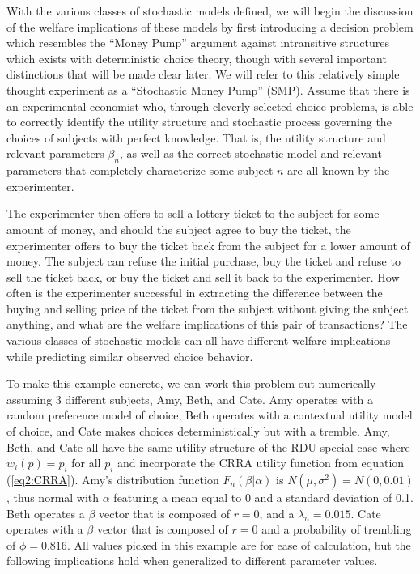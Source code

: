 \documentclass[11pt,a4paper]{report}
\begin{document}
With the various classes of stochastic models defined, we will begin the discussion of the welfare implications of these models by first introducing a decision problem which resembles the \enquote{Money Pump} argument against intransitive structures which exists with deterministic choice theory, though with several important distinctions that will be made clear later.
We will refer to this relatively simple thought experiment as a \enquote{Stochastic Money Pump} (SMP).
Assume that there is an experimental economist who, through cleverly selected choice problems, is able to correctly identify the utility structure and stochastic process governing the choices of subjects with perfect knowledge.
That is, the utility structure and relevant parameters $\beta_n$, as well as the correct stochastic model and relevant parameters that completely characterize some subject $n$ are all known by the experimenter.

The experimenter then offers to sell a lottery ticket to the subject for some amount of money, and should the subject agree to buy the ticket, the experimenter offers to buy the ticket back from the subject for a lower amount of money.
The subject can refuse the initial purchase, buy the ticket and refuse to sell the ticket back, or buy the ticket and sell it back to the experimenter.
How often is the experimenter successful in extracting the difference between the buying and selling price of the ticket from the subject without giving the subject anything, and what are the welfare implications of this pair of transactions?
The various classes of stochastic models can all have different welfare implications while predicting similar observed choice behavior.

To make this example concrete, we can work this problem out numerically assuming 3 different subjects, Amy, Beth, and Cate.
Amy operates with a random preference model of choice, Beth operates with a contextual utility model of choice, and Cate makes choices deterministically but with a tremble.
Amy, Beth, and Cate all have the same utility structure of the RDU special case where $w_i(p)=p_i$ for all $p_i$ and incorporate the CRRA utility function from equation (\ref{eq2:CRRA}).
Amy's distribution function $F_n(\beta|\alpha)$ is $N(\mu,\sigma^2) = N(0,0.01)$, thus normal with $\alpha$ featuring a mean equal to 0 and a standard deviation of 0.1.
Beth operates a $\beta$ vector that is composed of $r=0$, and a $\lambda_n = 0.015$.
Cate operates with a $\beta$ vector that is composed of $r=0$ and a probability of trembling of $\phi = 0.816$.
All values picked in this example are for ease of calculation, but the following implications hold when generalized to different parameter values.
\end{document}

